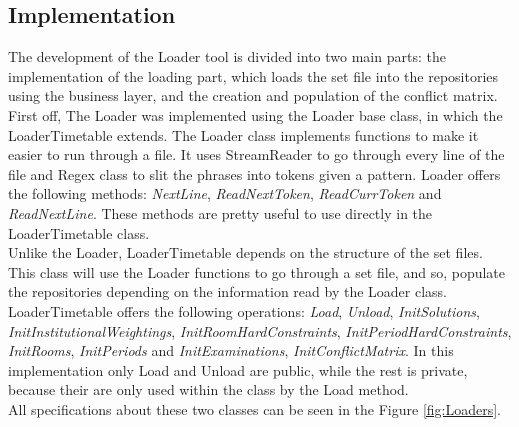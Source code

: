 \subsection{Implementation}

The development of the Loader tool is divided into two main parts: the implementation of the loading part, which loads the set file into the repositories using the business layer, and the creation and population of the conflict matrix.\\

First off, The Loader was implemented using the Loader base class, in which the LoaderTimetable extends. The Loader class implements functions to make it easier to run through a file. It uses StreamReader \cite{Microsoft2015} to go through every line of the file and Regex \cite{Microsoft2015a} class to slit the phrases into tokens given a pattern. Loader offers the following methods: \textit{NextLine}, \textit{ReadNextToken}, \textit{ReadCurrToken} and \textit{ReadNextLine}. These methods are pretty useful to use directly in the LoaderTimetable class. \\

Unlike the Loader, LoaderTimetable depends on the structure of the set files. This class will use the Loader functions to go through a set file, and so, populate the repositories depending on the information read by the Loader class. LoaderTimetable offers the following operations: \textit{Load}, \textit{Unload}, \textit{InitSolutions}, \textit{InitInstitutionalWeightings}, \textit{InitRoomHardConstraints}, \textit{InitPeriodHardConstraints}, \textit{InitRooms}, \textit{InitPeriods} and \textit{InitExaminations}, \textit{InitConflictMatrix}. In this implementation only Load and Unload are public, while the rest is private, because their are only used within the class by the Load method.\\

All specifications about these two classes can be seen in the Figure \ref{fig:Loaders}.\\

